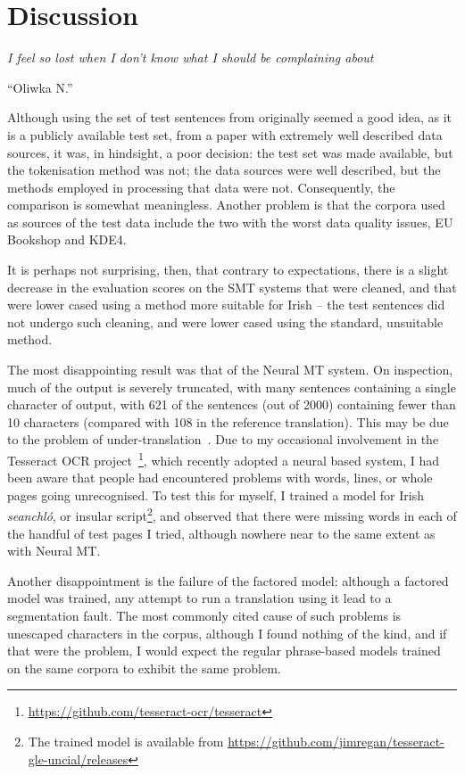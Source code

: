\chapter{Discussion}
\label{chap:discuss}
\epigraph{\textit{\small{I feel so lost when I don't know what I should be complaining about}}}{``Oliwka N.''}

Although using the set of test sentences from \citet{ARCAN16.9} originally seemed a good idea, as it
is a publicly available test set, from a paper with extremely well described data sources, it was, in
hindsight, a poor decision: the test set was made available, but the tokenisation method was not; the
data sources were well described, but the methods employed in processing that data were not. Consequently,
the comparison is somewhat meaningless. Another problem is that the corpora used as sources of the test
data include the two with the worst data quality issues, EU Bookshop and KDE4.

It is perhaps not surprising, then, that contrary to expectations, there is a slight decrease in the evaluation
scores on the SMT systems that were cleaned, and that were lower cased using a method more suitable for Irish --
the test sentences did not undergo such cleaning, and were lower cased using the standard, unsuitable method.

The most disappointing result was that of the Neural MT system. On inspection, much of the output is severely truncated,
with many sentences containing a single character of output, with 621 of the sentences (out of 2000) containing fewer 
than 10 characters (compared with 108 in the reference translation). This may be due to the problem of 
under-translation~\citep{Tu:2016:ACL}. Due to my occasional involvement in the Tesseract OCR 
project~\footnote{\href{https://github.com/tesseract-ocr/tesseract}{https://github.com/tesseract-ocr/tesseract}}, which recently
adopted a neural based system, I had been aware that people had encountered problems with words, lines, or whole
pages going unrecognised. To test this for myself, I trained a model for Irish \textit{seanchl\'o}, or insular 
script\footnote{The trained model is available from \href{https://github.com/jimregan/tesseract-gle-uncial/releases}{https://github.com/jimregan/tesseract-gle-uncial/releases}},
and observed that there were missing words in each of the handful of test pages I tried, although nowhere near to
the same extent as with Neural MT.

Another disappointment is the failure of the factored model: although a factored model was trained, any attempt to
run a translation using it lead to a segmentation fault. The most commonly cited cause of such problems is unescaped
characters in the corpus, although I found nothing of the kind, and if that were the problem, I would expect the 
regular phrase-based models trained on the same corpora to exhibit the same problem.
